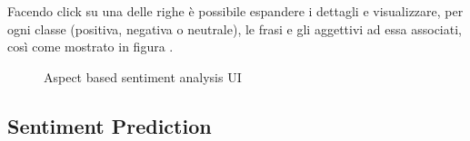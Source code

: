 \documentclass[hidelinks, 12pt]{article}
\begin{document}
Facendo click su una delle righe è possibile espandere i dettagli e visualizzare, per ogni classe (positiva, negativa o neutrale), le frasi e gli aggettivi ad essa associati, così come mostrato in figura .

\begin{figure}[H]
	\centering
	\endminipage
	\hfill
	\endminipage
	\caption{Aspect based sentiment analysis UI}
	\label{fig:aspect_ui_list}
\end{figure}



\subsection{Sentiment Prediction}
\end{document}

